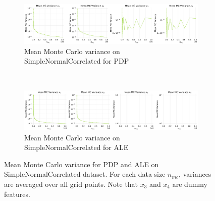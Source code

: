 \documentclass[runningheads]{llncs}
\begin{document}
\begin{figure}[h!]
    \centering
    \begin{subfigure}[b]{\textwidth}
        \centering
        \includegraphics[width=\textwidth]{img/SNC-all/mean_mc_variance_pdp.png}
        \caption{Mean Monte Carlo variance on SimpleNormalCorrelated for PDP}
    \end{subfigure}
    \\[10pt]
    \vfill
    \begin{subfigure}[b]{\textwidth}
        \centering
        \includegraphics[width=\textwidth]{img/SNC-all/mean_mc_variance_ale.png}
        \caption{Mean Monte Carlo variance on SimpleNormalCorrelated for ALE}
    \end{subfigure}
    \caption{Mean Monte Carlo variance for PDP and ALE on SimpleNormalCorrelated dataset.
        For each data size $n_{mc}$, variances are averaged over all grid points.
        Note that $x_3$ and $x_4$ are dummy features.}
    \label{fig:mean-mc-variance-snc}  %
\end{figure}
\end{document}
